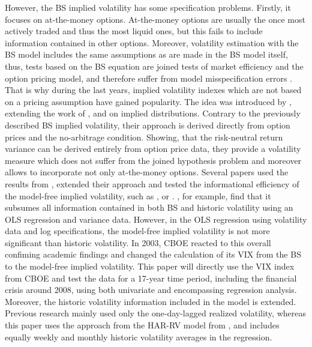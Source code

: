 However, the \ac{BS} implied volatility has some specification problems. Firstly, it focuses on at-the-money options. At-the-money options are usually the once most actively traded and thus the most liquid ones, but this fails to include information contained in other options. Moreover, volatility estimation with the \ac{BS} model includes the same assumptions as are made in the \ac{BS} model itself, thus, tests based on the \ac{BS} equation are joined tests of market efficiency and the option pricing model, and therefore suffer from model misspecification errors \parencite{jiang2003}. \\
That is why during the last years, implied volatility indexes which are not based on a pricing assumption have gained popularity. The idea was introduced by \textcite{britten2000}, extending the work of \textcite{derman1994} \textcite{dupire1994}, \textcite{dupire1997} and \textcite{rubinstein1994} on implied distributions. Contrary to the previously described \ac{BS} implied volatility, their approach is derived directly from option prices and the no-arbitrage condition. Showing, that the risk-neutral return variance can be derived entirely from option price data, they provide a volatility measure which does not suffer from the joined hypothesis problem and moreover allows to incorporate not only at-the-money options.
Several papers used the results from \textcite{britten2000}, extended their approach and tested the informational efficiency of the model-free implied volatility, such as \textcite{bakanova2010}, \textcite{taylor2010} or \textcite{jiang2003}. \textcite{jiang2003}, for example, find that it subsumes all information contained in both \ac{BS} and historic volatility using an OLS regression and variance data. However, in the OLS regression using volatility data and log specifications, the model-free implied volatility is not more significant than historic volatility.
In 2003, \ac{CBOE} reacted to this overall confiming academic findings and changed the calculation of its \ac{VIX} from the \ac{BS} to the model-free implied volatility. This paper will directly use the \ac{VIX} index from \ac{CBOE} and test the data for a 17-year time period, including the financial crisis around 2008, using both univariate and encompassing regression analysis. Moreover, the historic volatility information included in the model is extended. Previous research mainly used only the one-day-lagged realized volatility, whereas this paper uses the approach from the HAR-RV model from \textcite{corsi2009}, and includes equally weekly and monthly historic volatility averages in the regression. 





